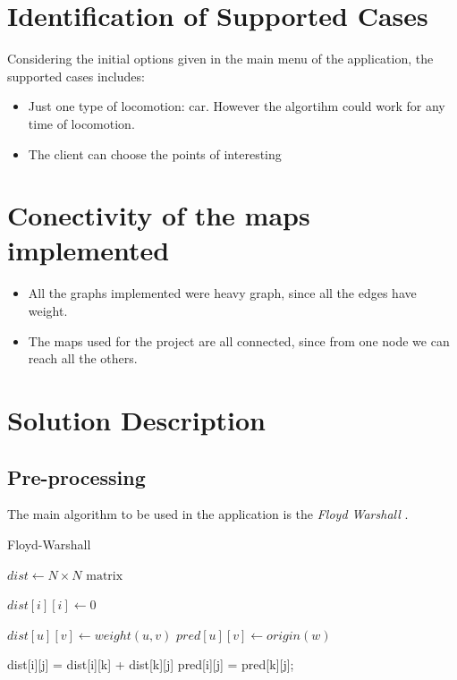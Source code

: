 \documentclass{article}
\begin{document}
\section*{Identification of Supported Cases}
    Considering the initial options given in the main menu of the application, the supported cases includes: 
    \begin{itemize}
        \item Just one type of locomotion: car. However the algortihm could work for any time of locomotion. 
        \item The client can choose the points of interesting 
        
    
    \end{itemize}
\section*{Conectivity of the maps implemented} 
    \begin{itemize}
        \item All the graphs implemented were heavy graph, since all the edges have weight.
        \item The maps used for the project are all connected, since from one node we can reach all the others. 
    \end{itemize}
    
\section*{Solution Description}

\subsection*{Pre-processing}
    The main algorithm to be used in the application is the \textit{Floyd Warshall} \cite{IntroductionToAlgorithms} \cite{FloydWarshal}. \par
    
    \begin{algorithm}[h]
    \caption{Floyd-Warshall}
    \begin{algorithmic}[1]
        \State $dist \gets N \times N \text{ matrix}$

            \State $dist[i][i] \gets 0$
        \EndFor
        
            \State $dist[u][v] \gets weight(u, v)$
            \State $pred[u][v] \gets origin(w)$ 
        \EndFor
        
                        \State dist[i][j] = dist[i][k] + dist[k][j]
                        \State pred[i][j] = pred[k][j];
                    \EndIf
                \EndFor
            \EndFor
        \EndFor
    \EndProcedure
    \end{algorithmic}
\end{algorithm}
\end{document}
